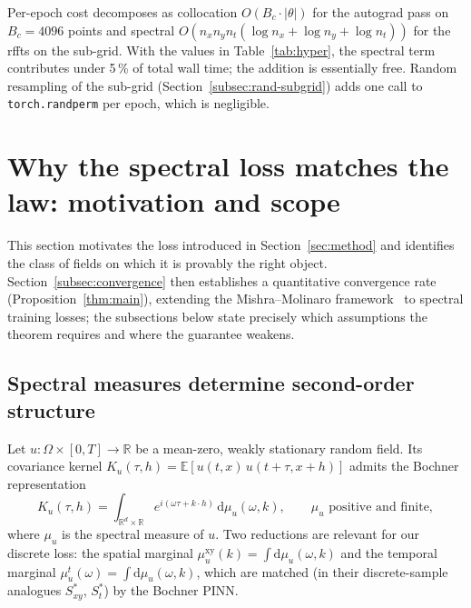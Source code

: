 \documentclass[review,12pt]{elsarticle}
\begin{document}
Per-epoch cost decomposes as collocation \(O(B_c \cdot |\theta|)\)
for the autograd pass on \(B_c = 4096\) points and spectral
\(O(n_x n_y n_t (\log n_x + \log n_y + \log n_t))\) for the rffts
on the sub-grid. With the values in Table~\ref{tab:hyper}, the
spectral term contributes under 5\,\% of total wall time; the
addition is essentially free. Random resampling of the sub-grid
(Section~\ref{subsec:rand-subgrid}) adds one call to
\texttt{torch.randperm} per epoch, which is negligible.

\section{Why the spectral loss matches the law: motivation and scope}
\label{sec:theory}

This section motivates the loss introduced in Section~\ref{sec:method}
and identifies the class of fields on which it is provably the right
object. Section~\ref{subsec:convergence} then establishes a
quantitative convergence rate (Proposition~\ref{thm:main}), extending
the Mishra--Molinaro framework~\cite{MishraMolinaro2022,DeRyckMishra2022}
to spectral training losses; the subsections below state precisely
which assumptions the theorem requires and where the guarantee weakens.

\subsection{Spectral measures determine second-order structure}

Let \(u : \Omega \times [0, T] \to \mathbb R\) be a mean-zero,
weakly stationary random field. Its covariance kernel
\(K_u(\tau, h) = \mathbb E[u(t,x)\,u(t+\tau, x+h)]\) admits the
Bochner representation~\cite[Thm.~9.18]{RudinRCA}
\begin{equation}
K_u(\tau, h) = \int_{\mathbb R^d \times \mathbb R}
e^{i(\omega \tau + k \cdot h)}\,\mathrm d\mu_u(\omega, k),
\qquad \mu_u\text{ positive and finite},
\label{eq:bochner}
\end{equation}
where \(\mu_u\) is the spectral measure of \(u\). Two reductions
are relevant for our discrete loss: the spatial marginal
\(\mu^{\mathrm{xy}}_u(k) = \int \mathrm d \mu_u(\omega, k)\) and
the temporal marginal
\(\mu^t_u(\omega) = \int \mathrm d \mu_u(\omega, k)\), which are
matched (in their discrete-sample analogues \(S^*_{xy}\),
\(S^*_t\)) by the Bochner PINN.
\end{document}
